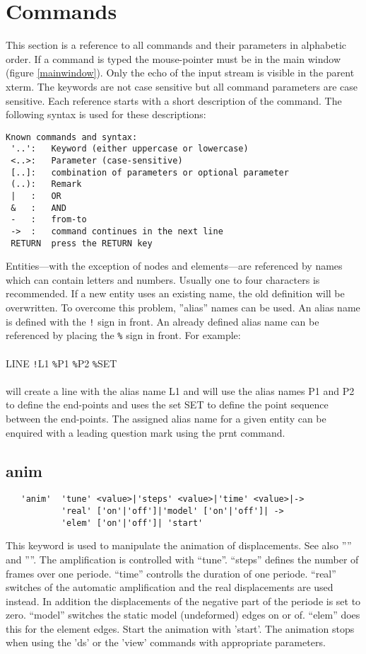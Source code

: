 \documentclass{article}
\begin{document}
\section{\label{Commands}Commands}
This section is a reference to all commands and their parameters in alphabetic order. If a command is typed the mouse-pointer must be in the main window (figure \ref{mainwindow}). Only the echo of the input stream is visible in the parent xterm. The keywords are not case sensitive but all command parameters are case sensitive. Each reference starts with a short description of the command. The following syntax is used for these descriptions:
\begin{verbatim}
Known commands and syntax:
 '..':   Keyword (either uppercase or lowercase)
 <..>:   Parameter (case-sensitive)
 [..]:   combination of parameters or optional parameter
 (..):   Remark
 |   :   OR
 &   :   AND
 -   :   from-to
 ->  :   command continues in the next line
 RETURN  press the RETURN key 
\end{verbatim}
Entities---with the exception of nodes and elements---are referenced by names which can contain letters and numbers. Usually one to four characters is recommended. If a new entity uses an existing name, the old definition will be overwritten. To overcome this problem, ''alias'' names can be used. An alias name is defined with the \verb_!_ sign in front. An already defined alias name can be referenced by placing the \verb_%_ sign in front. For example:\\\\
LINE \verb_!_L1 \verb_%_P1 \verb_%_P2 \verb_%_SET\\\\will create a line with the alias name L1 and will use the alias names P1 and P2 to define the end-points and uses the set SET to define the point sequence between the end-points. The assigned alias name for a given entity can be enquired with a leading question mark using the prnt command.


\subsection{\label{anim}anim}
\begin{verbatim}
   'anim'  'tune' <value>|'steps' <value>|'time' <value>|->
           'real' ['on'|'off']|'model' ['on'|'off']| ->
           'elem' ['on'|'off']| 'start'
\end{verbatim}
This keyword is used to manipulate the animation of displacements. See also '''' and ''''. The amplification is controlled with ``tune''. ``steps'' defines the number of frames over one periode. ``time'' controlls the duration of one periode. ``real'' switches of the automatic amplification and the real displacements are used instead. In addition the displacements of the negative part of the periode is set to zero. ``model'' switches the static model (undeformed) edges on or of. ``elem'' does this for the element edges. Start the animation with 'start'. The animation stops when using the 'ds' or the 'view' commands with appropriate parameters.
\end{document}
